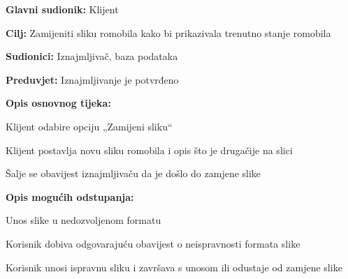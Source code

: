 						\begin{packed_item}
							
							\item \textbf{Glavni sudionik: }Klijent
							\item  \textbf{Cilj: }Zamijeniti sliku romobila kako bi prikazivala trenutno stanje romobila
							\item  \textbf{Sudionici: }Iznajmljivač, baza podataka
							\item  \textbf{Preduvjet: }Iznajmljivanje je potvrđeno
							\item  \textbf{Opis osnovnog tijeka:}
							
							\item[] \begin{packed_enum}
								
								\item Klijent odabire opciju „Zamijeni sliku“ 
								\item Klijent postavlja novu sliku romobila i opis što je drugačije na slici 
								\item Šalje se obavijest iznajmljivaču da je došlo do zamjene slike   
							\end{packed_enum}
							
							\item  \textbf{Opis mogućih odstupanja:}
							
							\item[] \begin{packed_item}
								
								\item[2.a] Unos slike u nedozvoljenom formatu 
								\item[] \begin{packed_enum}
									
									\item Korisnik dobiva odgovarajuću obavijest o neispravnosti formata slike 
									\item Korisnik unosi ispravnu sliku i završava s unosom ili odustaje od zamjene slike 
									
								\end{packed_enum}		
							\end{packed_item}
						\end{packed_item}
						\noindent {}

